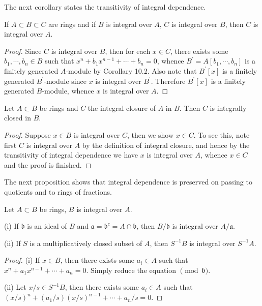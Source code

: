 The next corollary states the transitivity of integral dependence.
\begin{corollary}
If $A\subset B\subset C$ are rings and if $B$ is integral over $A$, $C$ is integral over $B$, then $C$ is integral over $A$.
\end{corollary}
\begin{proof}
Since $C$ is integral over $B$, then for each $x\in C$, there exists some $b_1,\cdots,b_n\in B$ such that $x^n+b_1x^{n-1}+\cdots+b_n=0$, whence $B^\prime=A[b_1,\cdots,b_n]$ is a finitely generated $A$-module by Corollary 10.2. Also note that $B^\prime[x]$ is a finitely generated $B^\prime$-module since $x$ is integral over $B^\prime$. Therefore $B^\prime[x]$ is a finitely generated $B$-module, whence $x$ is integral over $A$.
\end{proof}
\begin{corollary}
Let $A\subset B$ be rings and $C$ the integral closure of $A$ in $B$. Then $C$ is integrally closed in $B$.
\end{corollary}
\begin{proof}
Suppose $x\in B$ is integral over $C$, then we show $x\in C$. To see this, note first $C$ is integral over $A$ by the definition of integral closure, and hence by the transitivity of integral dependence we have $x$ is integral over $A$, whence $x\in C$ and the proof is finished.
\end{proof}
The next proposition shows that integral dependence is preserved on passing to quotients and to rings of fractions.
\begin{proposition}
Let $A\subset B$ be rings, $B$ is integral over $A$.\par
(i) If $\mathfrak{b}$ is an ideal of $B$ and $\mathfrak{a}=\mathfrak{b}^c=A\cap\mathfrak{b}$, then $B/\mathfrak{b}$ is integral over $A/\mathfrak{a}$.\par
(ii) If $S$ is a multiplicatively closed subset of $A$, then $S^{-1}B$ is integral over $S^{-1}A$.
\end{proposition}
\begin{proof}
(i) If $x\in B$, then there exists some $a_i\in A$ such that $x^n+a_1x^{n-1}+\cdots+a_n=0$. Simply reduce the equation $\pmod{\mathfrak{b}}$.\par
(ii) Let $x/s\in S^{-1}B$, then there exists some $a_i\in A$ such that $(x/s)^n+(a_1/s)(x/s)^{n-1}+\cdots+a_n/s=0$.
\end{proof}
